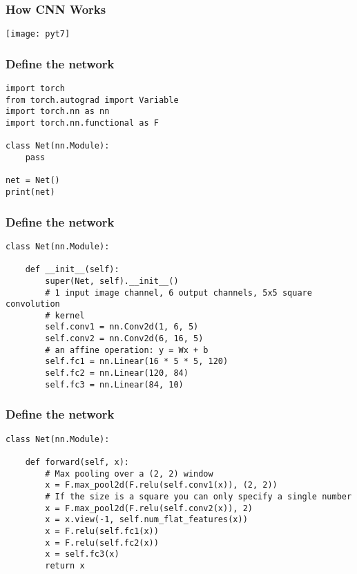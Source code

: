 \begin{frame}[fragile] \frametitle{How CNN Works}
\begin{center}
\texttt{[image: pyt7]}
\end{center}

\end{frame}


\begin{frame}[fragile] \frametitle{Define the network}
\begin{lstlisting}
import torch
from torch.autograd import Variable
import torch.nn as nn
import torch.nn.functional as F

class Net(nn.Module):
	pass
	
net = Net()
print(net)
\end{lstlisting}
\end{frame}

\begin{frame}[fragile] \frametitle{Define the network}
\begin{lstlisting}
class Net(nn.Module):

    def __init__(self):
        super(Net, self).__init__()
        # 1 input image channel, 6 output channels, 5x5 square convolution
        # kernel
        self.conv1 = nn.Conv2d(1, 6, 5)
        self.conv2 = nn.Conv2d(6, 16, 5)
        # an affine operation: y = Wx + b
        self.fc1 = nn.Linear(16 * 5 * 5, 120)
        self.fc2 = nn.Linear(120, 84)
        self.fc3 = nn.Linear(84, 10)
\end{lstlisting}
\end{frame}



\begin{frame}[fragile] \frametitle{Define the network}
\begin{lstlisting}
class Net(nn.Module):

    def forward(self, x):
        # Max pooling over a (2, 2) window
        x = F.max_pool2d(F.relu(self.conv1(x)), (2, 2))
        # If the size is a square you can only specify a single number
        x = F.max_pool2d(F.relu(self.conv2(x)), 2)
        x = x.view(-1, self.num_flat_features(x))
        x = F.relu(self.fc1(x))
        x = F.relu(self.fc2(x))
        x = self.fc3(x)
        return x
\end{lstlisting}
\end{frame}

